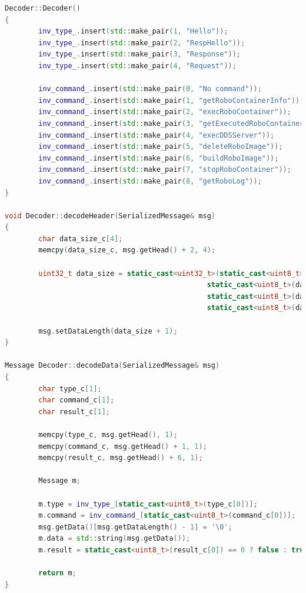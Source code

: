 \documentclass[a4paper, 14pt]{extreport}
\begin{document}
\begin{lstlisting}[language=C++, frame=single, xleftmargin=15pt, caption={Определение методов класса Decoder},label=DescriptiveLabel]
Decoder::Decoder()
{
        inv_type_.insert(std::make_pair(1, "Hello"));
        inv_type_.insert(std::make_pair(2, "RespHello"));
        inv_type_.insert(std::make_pair(3, "Response"));
        inv_type_.insert(std::make_pair(4, "Request"));

        inv_command_.insert(std::make_pair(0, "No command"));
        inv_command_.insert(std::make_pair(1, "getRoboContainerInfo"));
        inv_command_.insert(std::make_pair(2, "execRoboContainer"));
        inv_command_.insert(std::make_pair(3, "getExecutedRoboContainer"));
        inv_command_.insert(std::make_pair(4, "execDDSServer"));
        inv_command_.insert(std::make_pair(5, "deleteRoboImage"));
        inv_command_.insert(std::make_pair(6, "buildRoboImage"));
        inv_command_.insert(std::make_pair(7, "stopRoboContainer"));
        inv_command_.insert(std::make_pair(8, "getRoboLog"));
}

void Decoder::decodeHeader(SerializedMessage& msg)
{
        char data_size_c[4];
        memcpy(data_size_c, msg.getHead() + 2, 4);

        uint32_t data_size = static_cast<uint32_t>(static_cast<uint8_t>(data_size_c[0]) << 24 |
                                                static_cast<uint8_t>(data_size_c[1]) << 16 | 
                                                static_cast<uint8_t>(data_size_c[2]) << 8  |
                                                static_cast<uint8_t>(data_size_c[3]));

        msg.setDataLength(data_size + 1);
}

Message Decoder::decodeData(SerializedMessage& msg)
{
        char type_c[1];
        char command_c[1];
        char result_c[1];

        memcpy(type_c, msg.getHead(), 1);
        memcpy(command_c, msg.getHead() + 1, 1);
        memcpy(result_c, msg.getHead() + 6, 1);

        Message m;

        m.type = inv_type_[static_cast<uint8_t>(type_c[0])];
        m.command = inv_command_[static_cast<uint8_t>(command_c[0])];
        msg.getData()[msg.getDataLength() - 1] = '\0';
        m.data = std::string(msg.getData());
        m.result = static_cast<uint8_t>(result_c[0]) == 0 ? false : true;

        return m;
}
\end{lstlisting}
\end{document}
